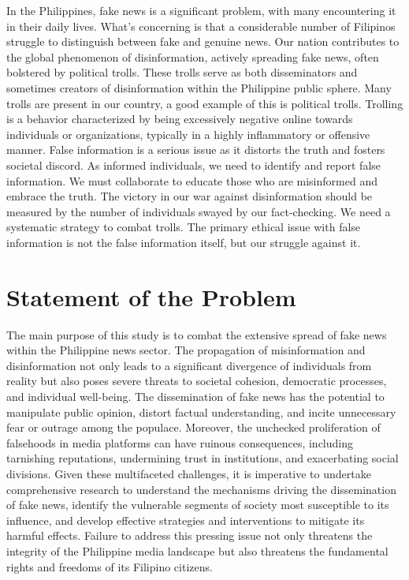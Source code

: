 \begin{refsection}
In the Philippines, fake news is a significant problem, with many encountering it in their daily lives. What's concerning is that a considerable number of Filipinos struggle to distinguish between fake and genuine news. Our nation contributes to the global phenomenon of disinformation, actively spreading fake news, often bolstered by political trolls. These trolls serve as both disseminators and sometimes creators of disinformation within the Philippine public sphere\cite{article1}. Many trolls are present in our country, a good example of this is political trolls. Trolling is a behavior characterized by being excessively negative online towards individuals or organizations, typically in a highly inflammatory or offensive manner\cite{political_trolling}. False information is a serious issue as it distorts the truth and fosters societal discord. As informed individuals, we need to identify and report false information. We must collaborate to educate those who are misinformed and embrace the truth. The victory in our war against disinformation should be measured by the number of individuals swayed by our fact-checking. We need a systematic strategy to combat trolls. The primary ethical issue with false information is not the false information itself, but our struggle against it.\cite{article1}


\section{Statement of the Problem}

The main purpose of this study is to combat the extensive spread of fake news within the Philippine news sector. The propagation of misinformation and disinformation not only leads to a significant divergence of individuals from reality but also poses severe threats to societal cohesion, democratic processes, and individual well-being. The dissemination of fake news has the potential to manipulate public opinion, distort factual understanding, and incite unnecessary fear or outrage among the populace. Moreover, the unchecked proliferation of falsehoods in media platforms can have ruinous consequences, including tarnishing reputations, undermining trust in institutions, and exacerbating social divisions. Given these multifaceted challenges, it is imperative to undertake comprehensive research to understand the mechanisms driving the dissemination of fake news, identify the vulnerable segments of society most susceptible to its influence, and develop effective strategies and interventions to mitigate its harmful effects. Failure to address this pressing issue not only threatens the integrity of the Philippine media landscape but also threatens the fundamental rights and freedoms of its Filipino citizens.



\end{refsection}

